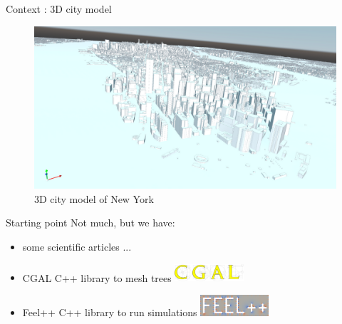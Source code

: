 \documentclass[10pt]{beamer}
\begin{document}
\begin{frame}{Context : 3D city model}
  \begin{figure}[h] %
    \centering
    \includegraphics[width=1\textwidth]{images/NY_mesh.png}
    \caption{3D city model of New York\cite{img:NY} } %
    \label{fig:city_model} %
  \end{figure}
\end{frame}

\begin{frame}{Starting point}
  Not much, but we have:
  \begin{itemize}
    \item<2-> some scientific articles \cite{Verdie14} \cite{Verdie15} \cite{Stava14} ...
    \item <3-> CGAL\cite{cgal} C++ library to mesh trees \includegraphics[width=0.2\textwidth]{images/cgal_logo.png}
    \item <4-> Feel++\cite{feel++} C++ library to run simulations \includegraphics[width=0.2\textwidth]{images/feelpp.png}
  \end{itemize}
\end{frame}
\end{document}
